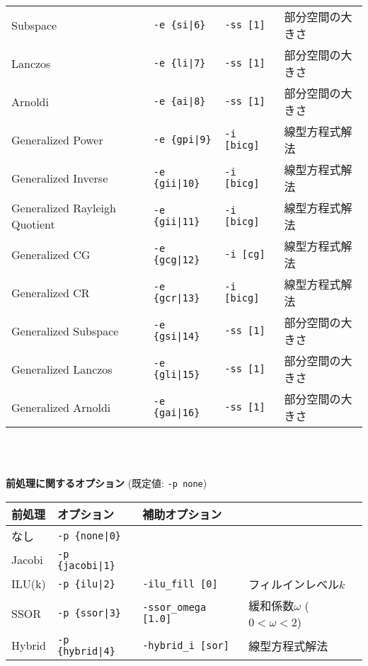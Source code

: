 \documentclass[a4paper]{jarticle}
\begin{document}
{{\begin{minipage}[t]{\textwidth}
\begin{center}
\begin{tabular}{l|lll}
 Subspace                & \verb=-e {si|6}=        &    \verb=-ss [1]= & 部分空間の大きさ \\
 Lanczos                 & \verb=-e {li|7}=        &    \verb=-ss [1]= & 部分空間の大きさ \\
 Arnoldi                 & \verb=-e {ai|8}=        &    \verb=-ss [1]= & 部分空間の大きさ \\
 Generalized Power      & \verb=-e {gpi|9}=       &    \verb=-i [bicg]= & 線型方程式解法 \\ 
 Generalized Inverse    & \verb=-e {gii|10}=       &    \verb=-i [bicg]= & 線型方程式解法 \\
 Generalized Rayleigh Quotient    & \verb=-e {gii|11}=       &    \verb=-i [bicg]= & 線型方程式解法 \\  
 Generalized CG         & \verb=-e {gcg|12}=       &    \verb=-i [cg]= & 線型方程式解法 \\
 Generalized CR         & \verb=-e {gcr|13}=       &    \verb=-i [bicg]= & 線型方程式解法 \\
 Generalized Subspace   & \verb=-e {gsi|14}=       &    \verb=-ss [1]= & 部分空間の大きさ \\
 Generalized Lanczos    & \verb=-e {gli|15}=       &    \verb=-ss [1]= & 部分空間の大きさ \\ 
 Generalized Arnoldi    & \verb=-e {gai|16}=       &    \verb=-ss [1]= & 部分空間の大きさ \\ 
\hline         
\end{tabular}
\end{center}
\end{minipage}
\\ \\
\begin{minipage}[t]{\textwidth}
\begin{center}
{\bf 前処理に関するオプション} (既定値: \verb=-p none=) \\
\begin{tabular}{l|lll}\hline\hline
前処理   & オプション           & 補助オプション \\ \hline
なし     & \verb=-p {none|0}=    &   \\
Jacobi   & \verb=-p {jacobi|1}=  &     \\
ILU(k)   & \verb=-p {ilu|2}=     & \verb=-ilu_fill [0]=    & フィルインレベル$k$ \\
SSOR     & \verb=-p {ssor|3}=    & \verb=-ssor_omega [1.0]=    & 緩和係数$\omega$ ($0<\omega<2$) \\
Hybrid   & \verb=-p {hybrid|4}=  & \verb=-hybrid_i [sor]=  & 線型方程式解法 \\

\end{tabular}
\end{center}
\end{minipage}}}
\end{document}
